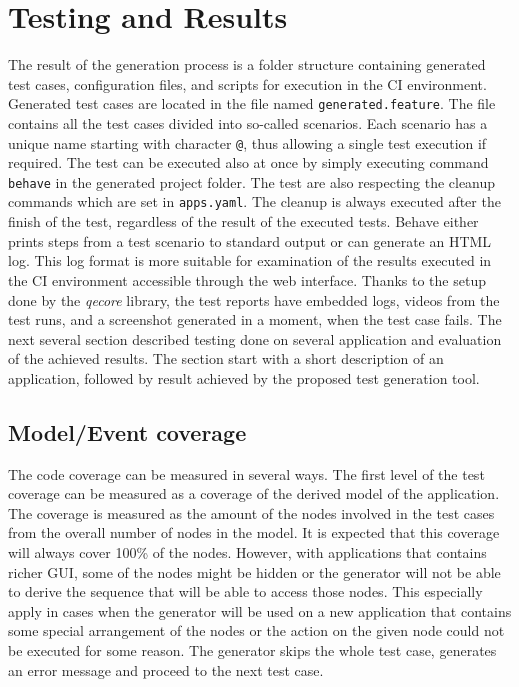

\chapter{Testing and Results}
The result of the generation process is a folder structure containing generated test cases, configuration files, and scripts for execution in the CI environment. Generated test cases are located in the file named \texttt{generated.feature}. The file contains all the test cases divided into so-called scenarios. Each scenario has a unique name starting with character \texttt{@}, thus allowing a single test execution if required. The test can be executed also at once by simply executing command \texttt{behave} in the generated project folder. The test are also respecting the cleanup commands which are set in \texttt{apps.yaml}. The cleanup is always executed after the finish of the test, regardless of the result of the executed tests. Behave either prints steps from a test scenario to standard output or can generate an HTML log. This log format is more suitable for examination of the results executed in the CI environment accessible through the web interface. Thanks to the setup done by the \textit{qecore} library, the test reports have embedded logs, videos from the test runs, and a screenshot generated in a moment, when the test case fails. The next several section described testing done on several application and evaluation of the achieved results. The section start with a short description of an application, followed by result achieved by the proposed test generation tool.  

\section{Model/Event coverage}
The code coverage can be measured in several ways. The first level of the test coverage can be measured as a coverage of the derived model of the application. The coverage is measured as the amount of the nodes involved in the test cases from the overall number of nodes in the model. It is expected that this coverage will always cover 100\% of the nodes. However, with applications that contains richer GUI, some of the nodes might be hidden or the generator will not be able to derive the sequence that will be able to access those nodes. This especially apply in cases when the generator will be used on a new application that contains some special arrangement of the nodes or the action on the given node could not be executed for some reason. The generator skips the whole test case, generates an error message and proceed to the next test case. 

